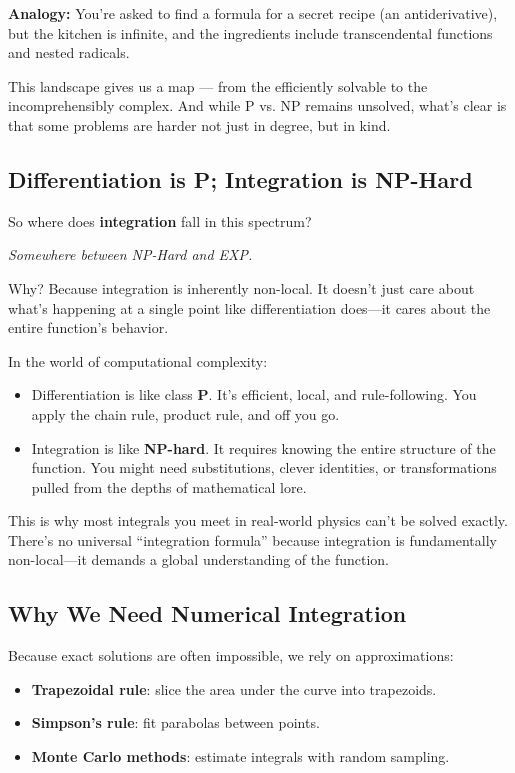\textbf{Analogy:} You're asked to find a formula for a secret recipe (an antiderivative), but the kitchen is infinite, and the ingredients include transcendental functions and nested radicals.

\vspace{1em}
This landscape gives us a map — from the efficiently solvable to the incomprehensibly complex. And while P vs. NP remains unsolved, what’s clear is that some problems are harder not just in degree, but in kind.


\subsection{Differentiation is P; Integration is NP-Hard}

So where does \textbf{integration} fall in this spectrum?

\textit{Somewhere between NP-Hard and EXP.}

Why? Because integration is inherently non-local. It doesn’t just care about what’s happening at a single point like differentiation does—it cares about the entire function’s behavior.


In the world of computational complexity:

\begin{itemize}
  \item Differentiation is like class \textbf{P}. It’s efficient, local, and rule-following. You apply the chain rule, product rule, and off you go.
  \item Integration is like \textbf{NP-hard}. It requires knowing the entire structure of the function. You might need substitutions, clever identities, or transformations pulled from the depths of mathematical lore.
\end{itemize}

This is why most integrals you meet in real-world physics can’t be solved exactly. There’s no universal “integration formula” because integration is fundamentally non-local—it demands a global understanding of the function.

\subsection{Why We Need Numerical Integration}

Because exact solutions are often impossible, we rely on approximations:

\begin{itemize}
  \item \textbf{Trapezoidal rule}: slice the area under the curve into trapezoids.
  \item \textbf{Simpson’s rule}: fit parabolas between points.
  \item \textbf{Monte Carlo methods}: estimate integrals with random sampling.
\end{itemize}

